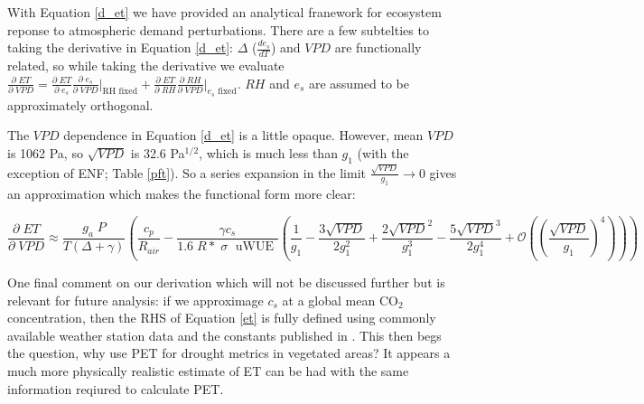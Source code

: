 \documentclass[draft,linenumbers]{agujournal}
\begin{document}
With Equation \ref{d_et} we have provided an analytical franework for ecosystem reponse to atmospheric demand perturbations. There are a few subtelties to taking the derivative in Equation \ref{d_et}: $\Delta$ ($\frac{d e_{s}}{d T}$) and $VPD$ are functionally related, so while taking the derivative we evaluate $\frac{\partial \; ET}{\partial \; VPD} = \frac{\partial \; ET} {\partial \; e_s} \frac{\partial \; e_s}{\partial \; VPD} \Big|_{\text{RH fixed}} + \frac{\partial \; ET}{\partial \; RH} \frac{\partial \; RH}{\partial \; VPD} \Big|_{\text{$e_s$ fixed}}$. $RH$ and $e_s$ are assumed to be approximately orthogonal.



The $VPD$ dependence in Equation \ref{d_et} is a little opaque. However, mean $VPD$ is 1062 Pa, so $\sqrt{VPD}$ is 32.6 Pa$^{1/2}$, which is much less than $g_1$ (with the exception of ENF; Table \ref{pft}). So a series expansion in the limit $\frac{\sqrt{VPD}}{g_1} \to 0$ gives an approximation which makes the functional form more clear: 

\begin{linenomath*}
  \begin{equation}
    \frac{\partial \;  ET}{\partial \; VPD} \approx \frac{g_a \; P}{T(\Delta + \gamma)}   \left(\frac{ c_p}{R_{air}} -  \frac{\gamma c_s }{1.6 \; R*\; \sigma \; \text{ uWUE }} \left( \frac{1}{g_{1}} - \frac{3 \sqrt{VPD}}{2 g_{1}^{2}} + \frac{2 \sqrt{VPD}^{2}}{g_{1}^{3}} - \frac{5 \sqrt{VPD}^{3}}{2 g_{1}^{4}} + \mathcal{O}\left(\left(\frac{\sqrt{VPD}}{g_1}\right)^{4}\right) \right) \right)
    \label{d_et_approx}
  \end{equation}
\end{linenomath*}

One final comment on our derivation which will not be discussed further but is relevant for future analysis: if we  approximage $c_s$ at a global mean CO$_2$ concentration, then the RHS of Equation \ref{et} is fully defined using commonly available weather station data and the constants published in \citet{Zhou_2015, Lin_2015}. This then begs the question, why use PET for drought metrics in vegetated areas? It appears a much more physically realistic estimate of ET can be had with the same information reqiured to calculate PET. 
\end{document}
